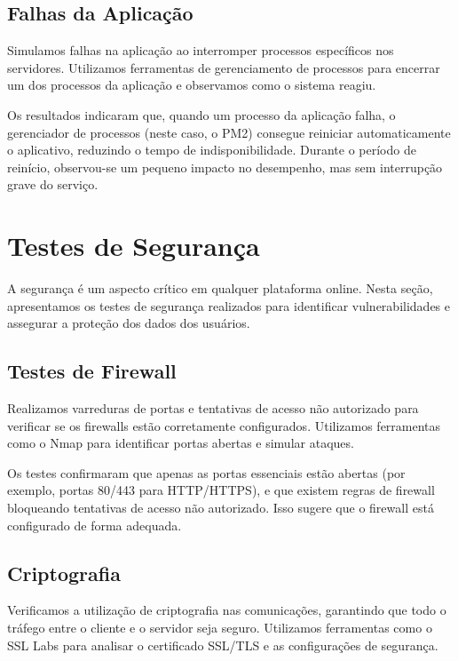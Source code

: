 \subsection{Falhas da Aplicação}

Simulamos falhas na aplicação ao interromper processos específicos nos servidores. Utilizamos ferramentas de gerenciamento de processos para encerrar um dos processos da aplicação e observamos como o sistema reagiu.

Os resultados indicaram que, quando um processo da aplicação falha, o gerenciador de processos (neste caso, o PM2) consegue reiniciar automaticamente o aplicativo, reduzindo o tempo de indisponibilidade. Durante o período de reinício, observou-se um pequeno impacto no desempenho, mas sem interrupção grave do serviço.

\section{Testes de Segurança}

A segurança é um aspecto crítico em qualquer plataforma online. Nesta seção, apresentamos os testes de segurança realizados para identificar vulnerabilidades e assegurar a proteção dos dados dos usuários.

\subsection{Testes de Firewall}

Realizamos varreduras de portas e tentativas de acesso não autorizado para verificar se os firewalls estão corretamente configurados. Utilizamos ferramentas como o Nmap para identificar portas abertas e simular ataques.

Os testes confirmaram que apenas as portas essenciais estão abertas (por exemplo, portas 80/443 para HTTP/HTTPS), e que existem regras de firewall bloqueando tentativas de acesso não autorizado. Isso sugere que o firewall está configurado de forma adequada.

\subsection{Criptografia}

Verificamos a utilização de criptografia nas comunicações, garantindo que todo o tráfego entre o cliente e o servidor seja seguro. Utilizamos ferramentas como o SSL Labs para analisar o certificado SSL/TLS e as configurações de segurança.

